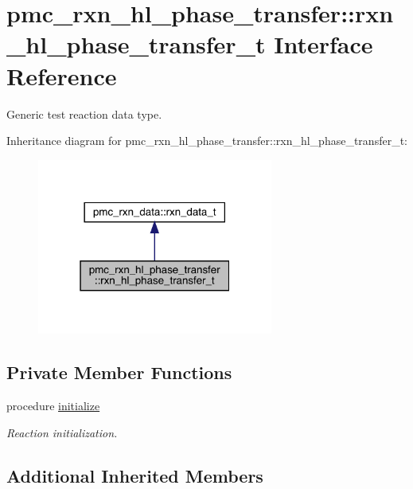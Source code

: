 \hypertarget{structpmc__rxn__hl__phase__transfer_1_1rxn__hl__phase__transfer__t}{}\section{pmc\+\_\+rxn\+\_\+hl\+\_\+phase\+\_\+transfer\+:\+:rxn\+\_\+hl\+\_\+phase\+\_\+transfer\+\_\+t Interface Reference}
\label{structpmc__rxn__hl__phase__transfer_1_1rxn__hl__phase__transfer__t}


Generic test reaction data type.  




Inheritance diagram for pmc\+\_\+rxn\+\_\+hl\+\_\+phase\+\_\+transfer\+:\+:rxn\+\_\+hl\+\_\+phase\+\_\+transfer\+\_\+t\+:\nopagebreak
\begin{figure}[H]
\begin{center}
\leavevmode
\includegraphics[width=220pt]{structpmc__rxn__hl__phase__transfer_1_1rxn__hl__phase__transfer__t__inherit__graph}
\end{center}
\end{figure}
\subsection*{Private Member Functions}
\begin{DoxyCompactItemize}
\item 
procedure \mbox{\hyperlink{structpmc__rxn__hl__phase__transfer_1_1rxn__hl__phase__transfer__t_a777c26fa56c78459ed3ea6a87f871992}{initialize}}
\begin{DoxyCompactList}\small\item\em Reaction initialization. \end{DoxyCompactList}\end{DoxyCompactItemize}
\subsection*{Additional Inherited Members}


